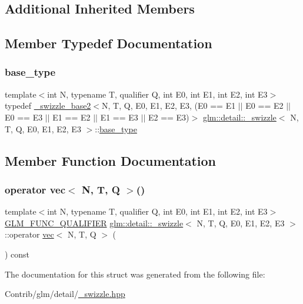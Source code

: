 \subsection*{Additional Inherited Members}


\subsection{Member Typedef Documentation}
\mbox{\label{structglm_1_1detail_1_1__swizzle_ac055459bca5651cfea9466ffd3a0daeb}} 
\subsubsection{\texorpdfstring{base\+\_\+type}{base\_type}}
{\footnotesize\ttfamily template$<$int N, typename T, qualifier Q, int E0, int E1, int E2, int E3$>$ \\
typedef \mbox{\hyperlink{structglm_1_1detail_1_1__swizzle__base2}{\+\_\+swizzle\+\_\+base2}}$<$N, T, Q, E0, E1, E2, E3, (E0 == E1 $\vert$$\vert$ E0 == E2 $\vert$$\vert$ E0 == E3 $\vert$$\vert$ E1 == E2 $\vert$$\vert$ E1 == E3 $\vert$$\vert$ E2 == E3)$>$ \mbox{\hyperlink{structglm_1_1detail_1_1__swizzle}{glm\+::detail\+::\+\_\+swizzle}}$<$ N, T, Q, E0, E1, E2, E3 $>$\+::\mbox{\hyperlink{structglm_1_1detail_1_1__swizzle_ac055459bca5651cfea9466ffd3a0daeb}{base\+\_\+type}}}



\subsection{Member Function Documentation}
\mbox{\label{structglm_1_1detail_1_1__swizzle_ab4237b43cd0b0b081668ba6ab1072903}} 
\subsubsection{\texorpdfstring{operator vec$<$ N, T, Q $>$()}{operator vec< N, T, Q >()}}
{\footnotesize\ttfamily template$<$int N, typename T, qualifier Q, int E0, int E1, int E2, int E3$>$ \\
\mbox{\hyperlink{setup_8hpp_a33fdea6f91c5f834105f7415e2a64407}{G\+L\+M\+\_\+\+F\+U\+N\+C\+\_\+\+Q\+U\+A\+L\+I\+F\+I\+ER}} \mbox{\hyperlink{structglm_1_1detail_1_1__swizzle}{glm\+::detail\+::\+\_\+swizzle}}$<$ N, T, Q, E0, E1, E2, E3 $>$\+::operator \mbox{\hyperlink{structglm_1_1vec}{vec}}$<$ N, T, Q $>$ (\begin{DoxyParamCaption}{ }\end{DoxyParamCaption}) const\hspace{0.3cm}{\ttfamily [inline]}}



The documentation for this struct was generated from the following file\+:\begin{DoxyCompactItemize}
\item 
Contrib/glm/detail/\mbox{\hyperlink{__swizzle_8hpp}{\+\_\+swizzle.\+hpp}}\end{DoxyCompactItemize}
